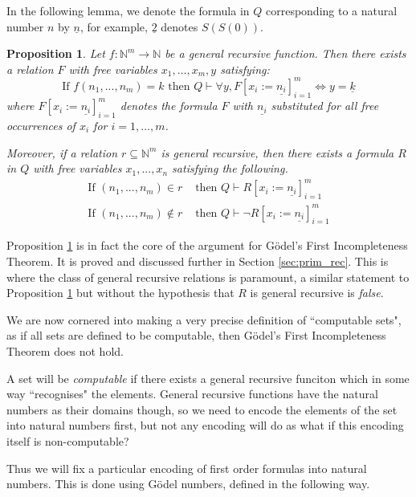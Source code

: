 \documentclass[12pt]{article}
\theoremstyle{plain}
\newtheorem{proposition}[thm]{Proposition}
\theoremstyle{definition}
\newcommand{\bb}[1]{\mathbb{#1}}
\newcommand{\lto}{\longrightarrow}
\begin{document}
	In the following lemma, we denote the formula in $Q$ corresponding to a natural number $n$ by $\underline{n}$, for example, $\underline{2}$ denotes $S(S(0))$.
	\begin{proposition}\label{lem:strongly_representable_intro}
		Let $f: \bb{N}^m \lto \bb{N}$ be a general recursive function. Then there exists a relation $F$ with free variables $x_1,\ldots, x_m, y$ satisfying:
		\begin{equation}
			\text{If }f(n_1,...,n_m) = k \text{ then }Q\vdash \forall y, F[x_i := \underline{n_i}]_{i = 1}^m\Longleftrightarrow y = \underline{k}
		\end{equation}
	where $F[x_i := \underline{n_i}]_{i = 1}^m$ denotes the formula $F$ with $\underline{n_i}$ substituted for all free occurrences of $x_i$ for $i = 1,\ldots, m$.
	
	Moreover, if a relation $r \subseteq \bb{N}^m$ is general recursive, then there exists a formula $R$ in $Q$ with free variables $x_1,...,x_n$ satisfying the following.
	\begin{align*}
		\text{If }(n_1,...,n_m) \in r &\text{ then }Q\vdash R[x_i := \underline{n_i}]_{i = 1}^m\\
		\text{If }(n_1,...,n_m) \not\in r &\text{ then }Q\vdash\neg R[x_i := \underline{n_i}]_{i = 1}^m
	\end{align*}
	\end{proposition}
	Proposition \ref{lem:strongly_representable_intro} is in fact the core of the argument for G\"{o}del's First Incompleteness Theorem. It is proved and discussed further in Section \ref{sec:prim_rec}. This is where the class of general recursive relations is paramount, a similar statement to Proposition \ref{lem:strongly_representable_intro} but without the hypothesis that $R$ is general recursive is \emph{false}.
	
	We are now cornered into making a very precise definition of ``computable sets", as if all sets are defined to be computable, then G\"{o}del's First Incompleteness Theorem does not hold.
	
	A set will be \emph{computable} if there exists a general recursive funciton which in some way ``recognises" the elements. General recursive functions have the natural numbers as their domains though, so we need to encode the elements of the set into natural numbers first, but not any encoding will do as what if this encoding itself is non-computable?
	
	Thus we will fix a particular encoding of first order formulas into natural numbers. This is done using G\"{o}del numbers, defined in the following way.
	
\end{document}
